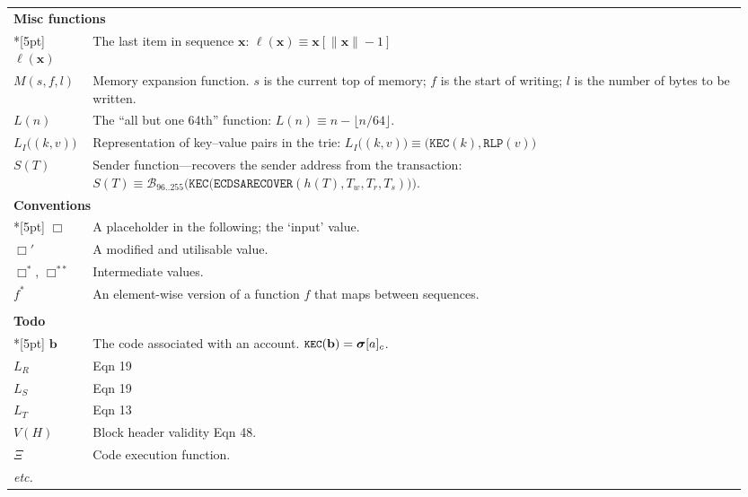 \documentclass[9pt,oneside]{amsart}
\begin{document}
\begin{longtable}{p{0.10\linewidth}p{0.85\linewidth}}
\vspace{5pt} \\
\midrule
\multicolumn{2}{l}{\textbf{Misc functions}} \\*[5pt]
$\ell(\mathbf{x})$ & The last item in sequence $\mathbf{x}$: $\ell(\mathbf{x})
\equiv \mathbf{x}[\lVert \mathbf{x} \rVert - 1]$ \\
$M(s, f, l)$ & Memory expansion function. $s$ is the current top of memory; $f$
is the start of writing; $l$ is the number of bytes to be written. \\
$L(n)$ & The ``all but one 64th'' function: $L(n) \equiv n - \lfloor n / 64 \rfloor$.\\
$L_I\big( (k, v) \big)$ & Representation of key--value pairs in the trie:
$L_I\big( (k, v) \big) \equiv \big(\texttt{KEC}(k), \texttt{RLP}(v)\big)$ \\
$S(T)$ & Sender function---recovers the sender address from the
transaction: \newline $S(T) \equiv \mathcal{B}_{96..255}\big(\mathtt{KEC}\big( \mathtt{ECDSARECOVER}(h(T), T_w, T_r, T_s) \big) \big).$

\vspace{5pt} \\
\midrule
\multicolumn{2}{l}{\textbf{Conventions}} \\*[5pt]
$\Box$ & A placeholder in the following; the `input' value. \\
$\Box'$ & A modified and utilisable value. \\
$\Box^*$,  $\Box^{**}$ & Intermediate values. \\
$f^*$ & An element-wise version of a function $f$ that maps between sequences. \\

\vspace{5pt} \\
\midrule
\multicolumn{2}{l}{\textbf{Todo}} \\*[5pt]
$\mathbf{b}$ & The code associated with an account. $\texttt{\small KEC}(\mathbf{b}) = \boldsymbol{\sigma}[a]_c$. \\
$L_R$ & Eqn 19 \\
$L_S$ & Eqn 19 \\
$L_T$ & Eqn 13 \\
$V(H)$ & Block header validity Eqn 48. \\
$\Xi$ & Code execution function. \\
\textit{etc.} \\

\bottomrule
\end{longtable}
\end{document}
